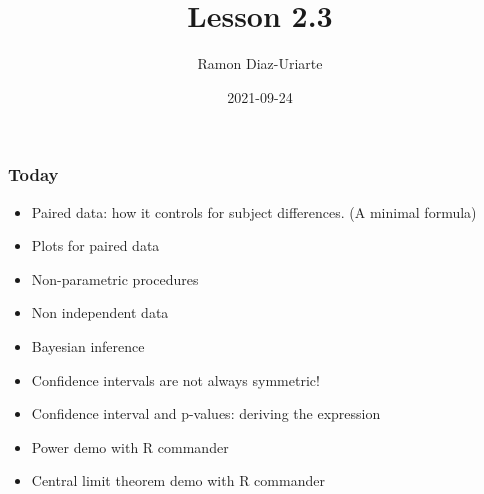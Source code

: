 \documentclass[bigger]{beamer}
\author{Ramon Diaz-Uriarte}
\date{2021-09-24}
\title{Lesson 2.3}
\begin{document}



\begin{frame}
  \frametitle{Today}
  \begin{itemize}
  \item Paired data: how it controls for subject differences. (A minimal formula)
  \item Plots for paired data
  \item Non-parametric procedures
  \item Non independent data
  \item Bayesian inference
  \item Confidence intervals are not always symmetric!
  \item Confidence interval and p-values: deriving the expression
  \item Power demo with R commander
  \item Central limit theorem demo with R commander
  \end{itemize}
\end{frame}
\end{document}

